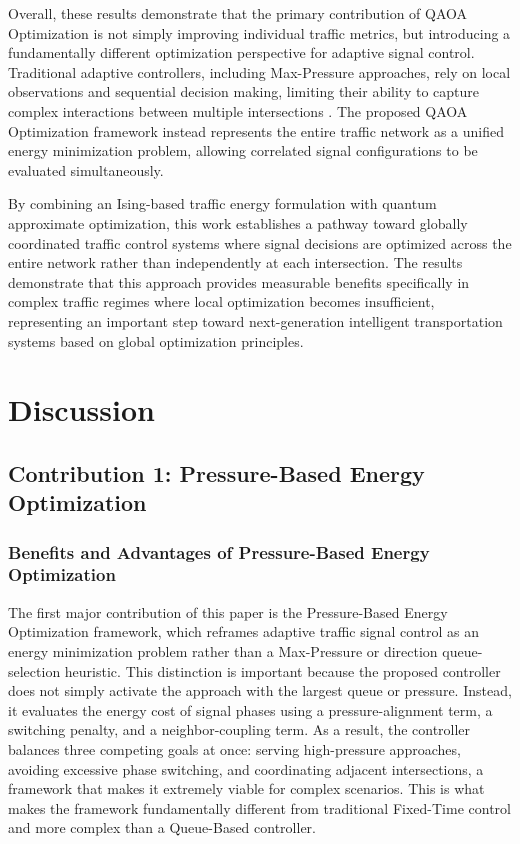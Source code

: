 \documentclass[12pt]{article}
\begin{document}
Overall, these results demonstrate that the primary contribution of QAOA Optimization is not simply improving individual traffic metrics, but introducing a fundamentally different optimization perspective for adaptive signal control. Traditional adaptive controllers, including Max-Pressure approaches, rely on local observations and sequential decision making, limiting their ability to capture complex interactions between multiple intersections \cite{varaiya2013}. The proposed QAOA Optimization framework instead represents the entire traffic network as a unified energy minimization problem, allowing correlated signal configurations to be evaluated simultaneously.

By combining an Ising-based traffic energy formulation with quantum approximate optimization, this work establishes a pathway toward globally coordinated traffic control systems where signal decisions are optimized across the entire network rather than independently at each intersection. The results demonstrate that this approach provides measurable benefits specifically in complex traffic regimes where local optimization becomes insufficient, representing an important step toward next-generation intelligent transportation systems based on global optimization principles.

\section{Discussion}

\subsection{Contribution 1: Pressure-Based Energy Optimization}

\subsubsection{Benefits and Advantages of Pressure-Based Energy Optimization}

The first major contribution of this paper is the Pressure-Based Energy Optimization framework, which reframes adaptive traffic signal control as an energy minimization problem rather than a Max-Pressure or direction queue-selection heuristic. This distinction is important because the proposed controller does not simply activate the approach with the largest queue or pressure. Instead, it evaluates the energy cost of signal phases using a pressure-alignment term, a switching penalty, and a neighbor-coupling term. As a result, the controller balances three competing goals at once: serving high-pressure approaches, avoiding excessive phase switching, and coordinating adjacent intersections, a framework that makes it extremely viable for complex scenarios. This is what makes the framework fundamentally different from traditional Fixed-Time control and more complex than a Queue-Based controller.
\end{document}
